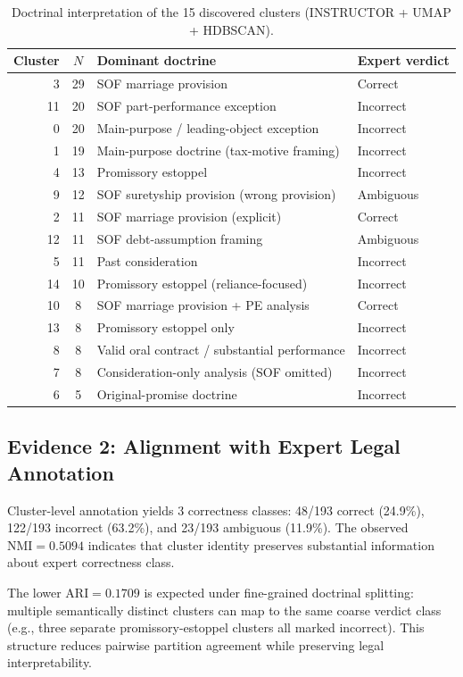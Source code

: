 \documentclass[11pt]{article}
\begin{document}
\begin{table}[ht]
\centering
\caption{Doctrinal interpretation of the 15 discovered clusters (INSTRUCTOR + UMAP + HDBSCAN).}
\label{tab:cluster_doctrine_map}
\begin{tabular}{rcll}
\toprule
Cluster & $N$ & Dominant doctrine & Expert verdict \\
\midrule
3 & 29 & SOF marriage provision & Correct \\
11 & 20 & SOF part-performance exception & Incorrect \\
0 & 20 & Main-purpose / leading-object exception & Incorrect \\
1 & 19 & Main-purpose doctrine (tax-motive framing) & Incorrect \\
4 & 13 & Promissory estoppel & Incorrect \\
9 & 12 & SOF suretyship provision (wrong provision) & Ambiguous \\
2 & 11 & SOF marriage provision (explicit) & Correct \\
12 & 11 & SOF debt-assumption framing & Ambiguous \\
5 & 11 & Past consideration & Incorrect \\
14 & 10 & Promissory estoppel (reliance-focused) & Incorrect \\
10 & 8 & SOF marriage provision + PE analysis & Correct \\
13 & 8 & Promissory estoppel only & Incorrect \\
8 & 8 & Valid oral contract / substantial performance & Incorrect \\
7 & 8 & Consideration-only analysis (SOF omitted) & Incorrect \\
6 & 5 & Original-promise doctrine & Incorrect \\
\bottomrule
\end{tabular}
\end{table}

\subsection{Evidence 2: Alignment with Expert Legal Annotation}
Cluster-level annotation yields 3 correctness classes: 48/193 correct (24.9\%), 122/193 incorrect (63.2\%), and 23/193 ambiguous (11.9\%). The observed $\mathrm{NMI}=0.5094$ indicates that cluster identity preserves substantial information about expert correctness class.

The lower $\mathrm{ARI}=0.1709$ is expected under fine-grained doctrinal splitting: multiple semantically distinct clusters can map to the same coarse verdict class (e.g., three separate promissory-estoppel clusters all marked incorrect). This structure reduces pairwise partition agreement while preserving legal interpretability.
\end{document}
